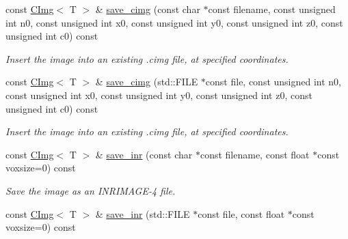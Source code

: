 \begin{DoxyCompactItemize}
\item 
\hypertarget{structcimg__library_1_1CImg_aa833a5e94fa21d6eb46da870f62fd7f4}{
const \hyperlink{structcimg__library_1_1CImg}{CImg}$<$ T $>$ \& \hyperlink{structcimg__library_1_1CImg_aa833a5e94fa21d6eb46da870f62fd7f4}{save\_\-cimg} (const char $\ast$const filename, const unsigned int n0, const unsigned int x0, const unsigned int y0, const unsigned int z0, const unsigned int c0) const }
\label{structcimg__library_1_1CImg_aa833a5e94fa21d6eb46da870f62fd7f4}

\begin{DoxyCompactList}\small\item\em Insert the image into an existing .cimg file, at specified coordinates. \item\end{DoxyCompactList}\item 
\hypertarget{structcimg__library_1_1CImg_a668d18c5219d19f105de2c8daa6accdd}{
const \hyperlink{structcimg__library_1_1CImg}{CImg}$<$ T $>$ \& \hyperlink{structcimg__library_1_1CImg_a668d18c5219d19f105de2c8daa6accdd}{save\_\-cimg} (std::FILE $\ast$const file, const unsigned int n0, const unsigned int x0, const unsigned int y0, const unsigned int z0, const unsigned int c0) const }
\label{structcimg__library_1_1CImg_a668d18c5219d19f105de2c8daa6accdd}

\begin{DoxyCompactList}\small\item\em Insert the image into an existing .cimg file, at specified coordinates. \item\end{DoxyCompactList}\item 
\hypertarget{structcimg__library_1_1CImg_aad7417f32dcb34d8151ecd232b07fbe7}{
const \hyperlink{structcimg__library_1_1CImg}{CImg}$<$ T $>$ \& \hyperlink{structcimg__library_1_1CImg_aad7417f32dcb34d8151ecd232b07fbe7}{save\_\-inr} (const char $\ast$const filename, const float $\ast$const voxsize=0) const }
\label{structcimg__library_1_1CImg_aad7417f32dcb34d8151ecd232b07fbe7}

\begin{DoxyCompactList}\small\item\em Save the image as an INRIMAGE-\/4 file. \item\end{DoxyCompactList}\item 
\hypertarget{structcimg__library_1_1CImg_a4e6e019953cf0626152eb7036a6b52a7}{
const \hyperlink{structcimg__library_1_1CImg}{CImg}$<$ T $>$ \& \hyperlink{structcimg__library_1_1CImg_a4e6e019953cf0626152eb7036a6b52a7}{save\_\-inr} (std::FILE $\ast$const file, const float $\ast$const voxsize=0) const }
\label{structcimg__library_1_1CImg_a4e6e019953cf0626152eb7036a6b52a7}


\end{DoxyCompactItemize}

